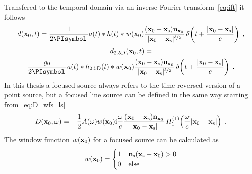 Transfered to the temporal domain via an inverse Fourier transform~\eqref{eq:ift} it follows
%
\begin{equation}
    d(\x_0,t) = \frac{1}{2\PI} a(t) * h(t) * w(\x_0)
    \frac{(\x_0-\xs)\n_{\x_0}}{|\x_0-\xs|^{\nicefrac{3}{2}}}
    \deltafunc{t+\frac{|\x_0-\xs|}{c}} \qc
    \label{eq:d_wfs_fs}
\end{equation}
%
\begin{multline}
    d_\twohalfD(\x_0,t) = \\
    \frac{g_0}{2\PI} a(t) * h_\twohalfD(t) * w(\x_0)
    \frac{(\x_0-\xs)\n_{\x_0}}{|\x_0-\xs|^{\nicefrac{3}{2}}}
    \deltafunc{t+\frac{|\x_0-\xs|}{c}} \qp
    \label{eq:d_wfs_fs_25D}
\end{multline}
%
In this thesis a focused source always refers to the time-reversed
version of a point source, but a focused line source can be defined in the
same way starting from~\eqref{eq:D_wfs_ls}
%
\begin{equation}
    D(\x_0,\omega) = -\frac{1}{2}A(\omega) w(\x_0) \I\omegac
    \frac{(\x_0-\xs)\n_{\x_0}}{|\x_0-\xs|}
    \H{1}{1}\left(\omegac|\x_0-\xs|\right) \qp
    \label{eq:D_wfs_ls_fs}
\end{equation}
%
The window function $w(\mathbf{x}_0)$ for a focused source can be
calculated as
%
\begin{equation}
    w(\x_0) = 
    \begin{cases}
        1 & \n_\text{s} (\xs-\x_0) > 0 \\
        0 & \text{else}
    \end{cases}
    \label{eq:w_fs}
\end{equation}
%


